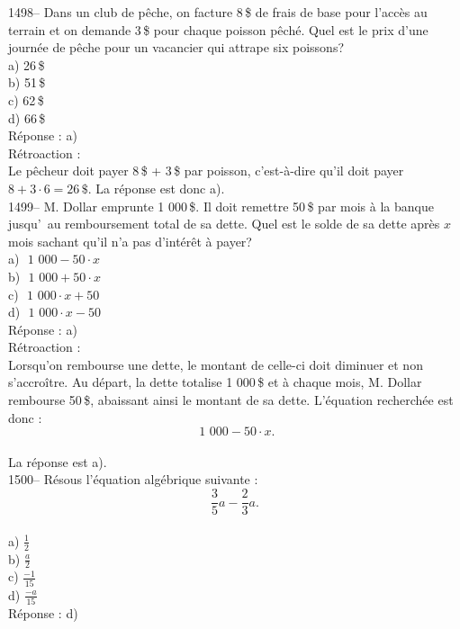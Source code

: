 1498-- Dans un club de p\^eche, on facture 8\,\$ de frais de base pour
l'acc\`es au terrain et on demande 3\,\$ pour chaque poisson
p\^ech\'e. Quel est le prix d'une journ\'ee de p\^eche pour un
vacancier qui attrape
six poissons?\\
a) 26\,\$\\
b) 51\,\$\\
c) 62\,\$\\
d) 66\,\$\\

R\'eponse : a)\\

R\'etroaction :\\
Le p\^echeur doit payer 8\,\$ + 3\,\$ par poisson, c'est-\`a-dire
qu'il doit payer
$8+3\cdot6 = 26\,\$$. La r\'eponse est donc a).\\

1499-- M. Dollar emprunte 1 000\,\$. Il doit remettre 50\,\$ par mois
\`a la banque jusqu'\ au remboursement total de sa dette. Quel est
le solde de sa dette apr\`es $x$ mois sachant qu'il n'a pas
d'int\'er\^et \`a payer?\\
a) ${\textrm{ 1 000}}-50\cdot x$\\
b) ${\textrm{ 1 000}}+50\cdot x$\\
c) ${\textrm{ 1 000}}\cdot x+50$\\
d) ${\textrm{ 1 000}}\cdot x-50$\\

R\'eponse : a)\\

R\'etroaction :\\
Lorsqu'on rembourse une dette, le montant de celle-ci doit diminuer
et non s'accro\^itre. Au d\'epart, la dette totalise 1 000\,\$ et
\`a chaque mois, M. Dollar rembourse 50\,\$, abaissant ainsi le
montant de sa dette.
L'\'equation recherch\'ee est donc : $${\textrm{ 1 000}}-50\cdot x.$$ \\La
r\'eponse est a).\\

1500-- R\'esous l'\'equation alg\'ebrique suivante :$$\frac{3}{5}a-
\frac{2}{3} a.$$\\
a)  $\frac{1}{2}$\\[3mm]
b)  $\frac{a}{2}$\\[3mm]
c)  $\frac{-1}{15}$\\[3mm]
d)  $\frac{-a}{15}$\\[3mm]

R\'eponse : d)\\


